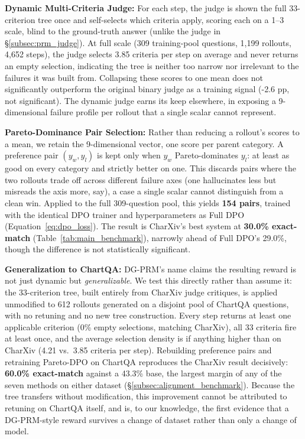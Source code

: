\documentclass[11pt]{article}
\begin{document}
\textbf{Dynamic Multi-Criteria Judge:} For each step, the judge is shown the full 33-criterion tree once and self-selects which criteria apply, scoring each on a 1--3 scale, blind to the ground-truth answer (unlike the judge in \S\ref{subsec:prm_judge}). At full scale (309 training-pool questions, 1,199 rollouts, 4,652 steps), the judge selects 3.85 criteria per step on average and never returns an empty selection, indicating the tree is neither too narrow nor irrelevant to the failures it was built from. Collapsing these scores to one mean does not significantly outperform the original binary judge as a training signal (-2.6 pp, not significant). The dynamic judge earns its keep elsewhere, in exposing a 9-dimensional failure profile per rollout that a single scalar cannot represent.

\textbf{Pareto-Dominance Pair Selection:} Rather than reducing a rollout's scores to a mean, we retain the 9-dimensional vector, one score per parent category. A preference pair $(y_w, y_l)$ is kept only when $y_w$ Pareto-dominates $y_l$: at least as good on every category and strictly better on one. This discards pairs where the two rollouts trade off across different failure axes (one hallucinates less but misreads the axis more, say), a case a single scalar cannot distinguish from a clean win. Applied to the full 309-question pool, this yields \textbf{154 pairs}, trained with the identical DPO trainer and hyperparameters as Full DPO (Equation~\ref{eq:dpo_loss}). The result is CharXiv's best system at \textbf{30.0\% exact-match} (Table~\ref{tab:main_benchmark}), narrowly ahead of Full DPO's 29.0\%, though the difference is not statistically significant.

\textbf{Generalization to ChartQA:} DG-PRM's name claims the resulting reward is not just dynamic but \textit{generalizable}. We test this directly rather than assume it: the 33-criterion tree, built entirely from CharXiv judge critiques, is applied unmodified to 612 rollouts generated on a disjoint pool of ChartQA \citep{masry2022chartqa} questions, with no retuning and no new tree construction. Every step returns at least one applicable criterion (0\% empty selections, matching CharXiv), all 33 criteria fire at least once, and the average selection density is if anything higher than on CharXiv (4.21 vs.\ 3.85 criteria per step). Rebuilding preference pairs and retraining Pareto-DPO on ChartQA reproduces the CharXiv result decisively: \textbf{60.0\% exact-match} against a 43.3\% base, the largest margin of any of the seven methods on either dataset (\S\ref{subsec:alignment_benchmark}). Because the tree transfers without modification, this improvement cannot be attributed to retuning on ChartQA itself, and is, to our knowledge, the first evidence that a DG-PRM-style reward survives a change of dataset rather than only a change of model.
\end{document}
